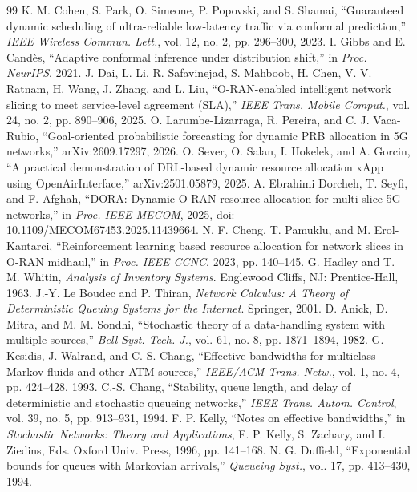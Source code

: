 \begin{thebibliography}{99}
 K. M. Cohen, S. Park, O. Simeone, P. Popovski, and S. Shamai, ``Guaranteed dynamic scheduling of ultra-reliable low-latency traffic via conformal prediction,'' \emph{IEEE Wireless Commun. Lett.}, vol. 12, no. 2, pp. 296--300, 2023.
 I. Gibbs and E. Cand\`es, ``Adaptive conformal inference under distribution shift,'' in \emph{Proc. NeurIPS}, 2021.
 J. Dai, L. Li, R. Safavinejad, S. Mahboob, H. Chen, V. V. Ratnam, H. Wang, J. Zhang, and L. Liu, ``O-RAN-enabled intelligent network slicing to meet service-level agreement (SLA),'' \emph{IEEE Trans. Mobile Comput.}, vol. 24, no. 2, pp. 890--906, 2025.
 O. Larumbe-Lizarraga, R. Pereira, and C. J. Vaca-Rubio, ``Goal-oriented probabilistic forecasting for dynamic PRB allocation in 5G networks,'' arXiv:2609.17297, 2026.
 O. Sever, O. Salan, I. Hokelek, and A. Gorcin, ``A practical demonstration of DRL-based dynamic resource allocation xApp using OpenAirInterface,'' arXiv:2501.05879, 2025.
 A. Ebrahimi Dorcheh, T. Seyfi, and F. Afghah, ``DORA: Dynamic O-RAN resource allocation for multi-slice 5G networks,'' in \emph{Proc. IEEE MECOM}, 2025, doi: 10.1109/MECOM67453.2025.11439664.
 N. F. Cheng, T. Pamuklu, and M. Erol-Kantarci, ``Reinforcement learning based resource allocation for network slices in O-RAN midhaul,'' in \emph{Proc. IEEE CCNC}, 2023, pp. 140--145.
 G. Hadley and T. M. Whitin, \emph{Analysis of Inventory Systems}. Englewood Cliffs, NJ: Prentice-Hall, 1963.
 J.-Y. Le Boudec and P. Thiran, \emph{Network Calculus: A Theory of Deterministic Queuing Systems for the Internet}. Springer, 2001.
 D. Anick, D. Mitra, and M. M. Sondhi, ``Stochastic theory of a data-handling system with multiple sources,'' \emph{Bell Syst. Tech. J.}, vol. 61, no. 8, pp. 1871--1894, 1982.
 G. Kesidis, J. Walrand, and C.-S. Chang, ``Effective bandwidths for multiclass Markov fluids and other ATM sources,'' \emph{IEEE/ACM Trans. Netw.}, vol. 1, no. 4, pp. 424--428, 1993.
 C.-S. Chang, ``Stability, queue length, and delay of deterministic and stochastic queueing networks,'' \emph{IEEE Trans. Autom. Control}, vol. 39, no. 5, pp. 913--931, 1994.
 F. P. Kelly, ``Notes on effective bandwidths,'' in \emph{Stochastic Networks: Theory and Applications}, F. P. Kelly, S. Zachary, and I. Ziedins, Eds. Oxford Univ. Press, 1996, pp. 141--168.
 N. G. Duffield, ``Exponential bounds for queues with Markovian arrivals,'' \emph{Queueing Syst.}, vol. 17, pp. 413--430, 1994.

\end{thebibliography}
